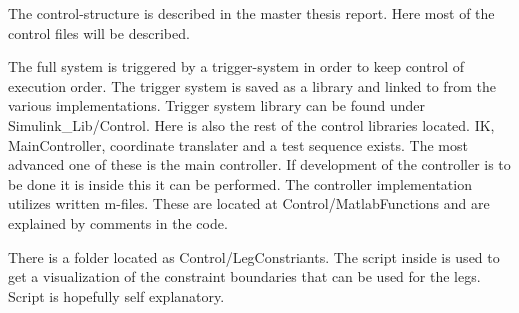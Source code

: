 The control-structure is described in the master thesis report.
Here most of the control files will be described.

The full system is triggered by a trigger-system in order to keep control of execution order.
The trigger system is saved as a library and linked to from the various implementations.
Trigger system library can be found under Simulink{\_}Lib/Control.
Here is also the rest of the control libraries located.
IK, MainController, coordinate translater and a test sequence exists.
The most advanced one of these is the main controller.
If development of the controller is to be done it is inside this it can be performed.
The controller implementation utilizes written m-files.
These are located at Control/MatlabFunctions and are explained by comments in the code.

There is a folder located as Control/LegConstriants.
The script inside is used to get a visualization of the constraint boundaries that can be used for the legs. 
Script is hopefully self explanatory.